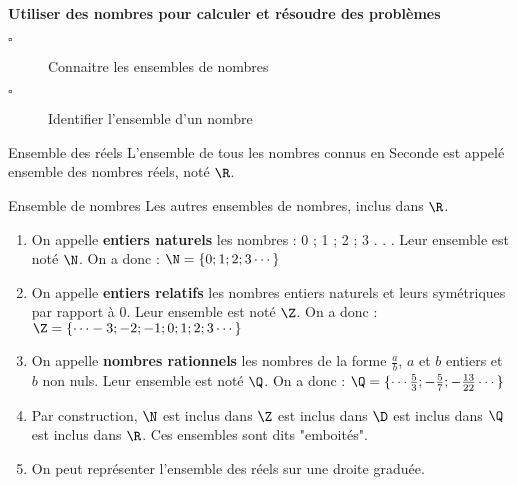 \begin{titre}

\end{titre}


\begin{CpsCol}
\textbf{Utiliser des nombres pour calculer et résoudre des problèmes}
\begin{description}
\item[$\square$] Connaitre les ensembles de nombres
\item[$\square$] Identifier l'ensemble d'un nombre
\end{description}
\end{CpsCol}




\begin{DefT}{Ensemble des réels}
L'ensemble de tous les nombres connus en Seconde est appelé ensemble des nombres réels, noté $\R$.
\end{DefT}

\begin{DefT}{Ensemble de nombres}
Les autres ensembles de nombres, inclus dans $\R$.
\begin{enumerate}
\item On appelle \textbf{entiers naturels} les nombres : 0 ; 1 ; 2 ; 3 . . . Leur ensemble est noté $\N$.
On a donc : $\N =  \lbrace 0 ; 1 ; 2 ; 3 \cdots \rbrace $
\item  On appelle \textbf{entiers relatifs} les nombres entiers naturels et leurs symétriques par rapport à 0. Leur ensemble est noté $\Z$.
On a donc : $\Z = \lbrace \cdots -3 ; -2 ; -1 ; 0 ; 1 ; 2 ; 3  \cdots  \rbrace$
\item  On appelle \textbf{nombres rationnels} les nombres de la forme $\frac{a}{b}$, $a$ et $b$ entiers et $b$ non nuls.  Leur ensemble est noté $\Q$. 
On a donc : $\Q = \lbrace \cdots \frac{5}{3} ; -\frac{5}{7} ; -\frac{13}{22} \cdots   \rbrace$
\item Par construction, $\N$ est inclus dans $\Z$  est inclus dans $\D$  est inclus dans $\Q$  est inclus dans $\R$. Ces ensembles sont dits "emboités".
\item  On peut représenter l'ensemble des réels sur une droite graduée.
\begin{center}
 \end{center} 
\end{enumerate}
\end{DefT}


